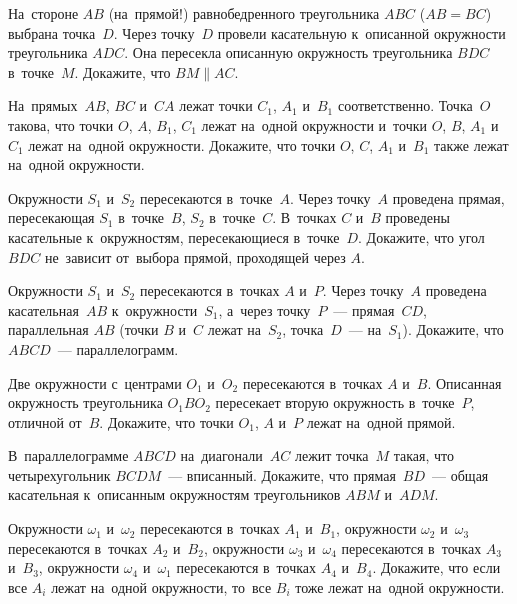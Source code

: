 


\begin{problems}

\item
На~стороне $AB$ (на~прямой!) равнобедренного треугольника $ABC$ ($AB = BC$)
выбрана точка~$D$.
Через точку~$D$ провели касательную к~описанной окружности треугольника $ADC$.
Она пересекла описанную окружность треугольника $BDC$ в~точке~$M$.
Докажите, что $BM \parallel AC$.

\item
На~прямых~$AB$, $BC$ и~$CA$ лежат точки $C_1$, $A_1$ и~$B_1$ соответственно.
Точка~$O$ такова, что точки $O$, $A$, $B_1$, $C_1$ лежат на~одной окружности
и~точки $O$, $B$, $A_1$ и~$C_1$ лежат на~одной окружности.
Докажите, что точки $O$, $C$, $A_1$ и~$B_1$ также лежат на~одной окружности.

\item
Окружности $S_1$ и~$S_2$ пересекаются в~точке~$A$.
Через точку~$A$ проведена прямая, пересекающая $S_1$ в~точке~$B$, $S_2$
в~точке~$C$.
В~точках $C$ и~$B$ проведены касательные к~окружностям, пересекающиеся
в~точке~$D$.
Докажите, что угол $BDC$ не~зависит от~выбора прямой, проходящей через $A$.

\item
Окружности $S_1$ и~$S_2$ пересекаются в~точках $A$ и~$P$.
Через точку~$A$ проведена касательная~$AB$ к~окружности~$S_1$, а~через
точку~$P$~--- прямая~$CD$, параллельная $AB$
(точки $B$ и~$C$ лежат на~$S_2$, точка~$D$~--- на~$S_1$).
Докажите, что $ABCD$~--- параллелограмм.

\item
Две окружности с~центрами $O_1$ и~$O_2$ пересекаются в~точках $A$ и~$B$.
Описанная окружность треугольника $O_1 B O_2$ пересекает вторую окружность
в~точке~$P$, отличной от~$B$.
Докажите, что точки $O_1$, $A$ и~$P$ лежат на~одной прямой.

\item
В~параллелограмме $ABCD$ на~диагонали~$AC$ лежит точка~$M$ такая, что
четырехугольник $BCDM$~--- вписанный.
Докажите, что прямая~$BD$~--- общая касательная к~описанным окружностям
треугольников $ABM$ и~$ADM$.

\item
Окружности $\omega_1$ и~$\omega_2$ пересекаются в~точках $A_1$ и~$B_1$,
окружности $\omega_2$ и~$\omega_3$ пересекаются в~точках $A_2$ и~$B_2$,
окружности $\omega_3$ и~$\omega_4$ пересекаются в~точках $A_3$ и~$B_3$,
окружности $\omega_4$ и~$\omega_1$ пересекаются в~точках $A_4$ и~$B_4$.
Докажите, что если все $A_i$ лежат на~одной окружности, то~все $B_i$ тоже
лежат на~одной окружности.


\end{problems}
